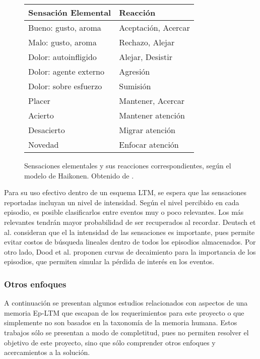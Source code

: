 \begin{figure}[H]
	\centering
	\begin{tabular}{| l | l |}
		\hline
		\rowcolor{gray!50}
		Sensación Elemental & Reacción  \\ 
		\hline Bueno: gusto, aroma & Aceptación, Acercar \\ 
		\hline Malo: gusto, aroma & Rechazo, Alejar \\ 
		\hline Dolor: autoinfligido  & Alejar, Desistir \\ 
		\hline Dolor: agente externo & Agresión \\ 
		\hline Dolor: sobre esfuerzo & Sumisión \\ 
		\hline Placer & Mantener, Acercar \\ 
		\hline Acierto & Mantener atención \\ 
		\hline Desacierto & Migrar atención \\ 
		\hline Novedad & Enfocar atención \\ 
		\hline 
	\end{tabular} 
	\caption{\small Sensaciones elementales y sus reacciones correspondientes, según el modelo de Haikonen. Obtenido de \cite{Dodd2005}.}
	\label{img:emotional_haikonen}
\end{figure}


Para su uso efectivo dentro de un esquema LTM, se espera que las sensaciones reportadas incluyan un nivel de intensidad. Según el nivel percibido en cada episodio, es posible clasificarlos entre eventos muy o poco relevantes. Los más relevantes tendrán mayor probabilidad de ser recuperados al recordar. Deutsch et al.  \cite{Deutsch2008} consideran que el la intensidad de las sensaciones es importante, pues permite evitar costos de búsqueda lineales dentro de todos los episodios almacenados. Por otro lado, Dood et al. proponen curvas de decaimiento para la importancia de los episodios, que permiten simular la pérdida de interés en los eventos.






\subsubsection{Otros enfoques}
A continuación se presentan algunos estudios relacionados con aspectos de una memoria Ep-LTM que escapan de los requerimientos para este proyecto o que simplemente no son basados en la taxonomía de la memoria humana. Estos trabajos sólo se presentan a modo de completitud, pues no permiten resolver el objetivo de este proyecto, sino que sólo comprender otros enfoques y acercamientos a la solución. 

